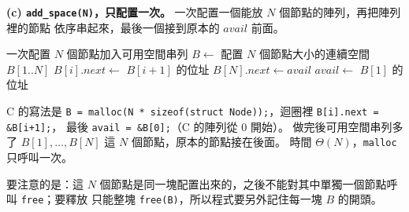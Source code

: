 \begin{pastsoln}
\textbf{(c) \texttt{add\_space(N)}，只配置一次。} 一次配置一個能放 $N$ 個節點的陣列，再把陣列裡的節點
依序串起來，最後一個接到原本的 $\mathit{avail}$ 前面。
\begin{pseudo}[unbreakable]{一次配置 $N$ 個節點加入可用空間串列}
    \State $B \gets$ 配置 $N$ 個節點大小的連續空間 $B[1..N]$ 
        \State {}
    \EndIf
        \State $B[i].\mathit{next} \gets$ $B[i + 1]$ 的位址
    \EndFor
    \State $B[N].\mathit{next} \gets \mathit{avail}$
    \State $\mathit{avail} \gets$ $B[1]$ 的位址
\EndProcedure
\end{pseudo}
C 的寫法是 \texttt{B = malloc(N * sizeof(struct Node));}，迴圈裡 \texttt{B[i].next = \&B[i+1];}，
最後 \texttt{avail = \&B[0];}（C 的陣列從 $0$ 開始）。 做完後可用空間串列多了 $B[1], \ldots, B[N]$ 這
$N$ 個節點，原本的節點接在後面。 時間 $\Theta(N)$，\texttt{malloc} 只呼叫一次。

要注意的是：這 $N$ 個節點是同一塊配置出來的，之後不能對其中單獨一個節點呼叫 \texttt{free}；要釋放
只能整塊 \texttt{free(B)}，所以程式要另外記住每一塊 $B$ 的開頭。
\end{pastsoln}
